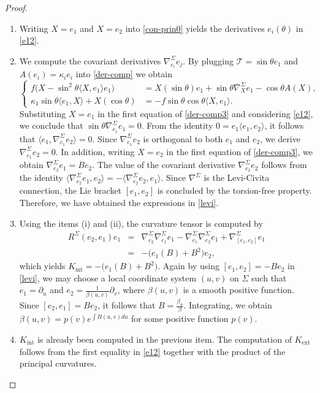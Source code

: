 \documentclass[12pt,reqno]{amsart}
\def\t{\mathcal T}
\theoremstyle{definition}
\begin{document}
\begin{proof}
\begin{enumerate}
\item[(i)] Writing $X=e_1$ and $X=e_2$ into \eqref{con-prin0} yields the derivatives $e_i(\theta)$ in \eqref{e12}.
\item[(ii)] We compute the covariant derivatives $\nabla^\Sigma_{e_i}e_j$. By plugging $\t=\sin\theta e_1$ and $A(e_i)=\kappa_ie_i$ into \eqref{der-comp} we obtain
\begin{equation}\label{der-comp3}
\left\{
\begin{aligned}
f\big(X-\sin^2 \theta\langle X,e_1\rangle e_1\big)
&=X(\sin \theta)e_1+\sin \theta\nabla^\Sigma_Xe_1-\cos \theta A(X),\\[4pt]
\kappa_1\sin \theta\langle e_1,X\rangle+ X(\cos \theta)
&=-f \sin \theta\cos \theta \langle X,e_1\rangle.
\end{aligned}
\right.
\end{equation}
Substituting $X=e_1$ in the first equation of \eqref{der-comp3} and considering \eqref{e12}, we conclude that $\sin \theta\nabla^\Sigma_{e_1}e_1=0$. From the identity $0=e_1\langle e_1,e_2\rangle$, it follows that $\langle e_1,\nabla^\Sigma_{e_1}e_2\rangle=0$. Since $\nabla^\Sigma_{e_1}e_2$ is orthogonal to both $e_1$ and $e_2$, we derive $\nabla^\Sigma_{e_1}e_2=0$. In addition, writing $X=e_2$ in the first equation of \eqref{der-comp3}, we obtain $ \nabla^\Sigma_{e_2}e_1=Be_2$. The value of the covariant derivative $\nabla^\Sigma_{e_2}e_2$  follows from the identity $\langle \nabla^\Sigma_{e_2}e_1,e_2\rangle=- \langle \nabla^\Sigma_{e_2}e_2,e_1\rangle.$ Since $\nabla^\Sigma$ is the Levi-Civita connection,  the Lie bracket $[e_1,e_2]$ is concluded by the torsion-free property. Therefore, we have obtained the expressions in \eqref{levi}.
\item[(iii)] Using the items (i) and (ii), the curvature tensor is computed by 
\begin{eqnarray*}
R^\Sigma(e_2,e_1)e_1&=&\nabla^\Sigma_{e_2}\nabla^\Sigma_{e_1}e_1-\nabla^\Sigma_{e_1}\nabla^\Sigma_{e_2}e_1+\nabla^\Sigma_{[e_1,e_2]}e_1 \\
&=& -\big(e_1(B)+B^2\big)e_2,
\end{eqnarray*}
which yields $K_{\mathrm{int}}=-\big(e_1(B)+B^2\big)$. Again by using $[e_1,e_2]=-Be_2$ in \eqref{levi}, we may choose a local coordinate system $(u,v)$ on $\Sigma$ such that $e_1=\partial_u$ and $e_2=\frac{1}{\beta(u,v)}\partial_v$, where $\beta(u,v)$ is a smooth positive function. Since $[e_2,e_1]=B e_2$, it follows that $B=\frac{\beta_u}{\beta}$. Integrating, we obtain $\beta(u,v)=p(v)e^{\int B(u,v)du}$ for some positive function $p(v)$. 
\item[(iv)] $K_{\mathrm{int}}$ is already been computed in the previous item. The computation of $K_{\mathrm{ext}}$ follows from the first equality in \eqref{e12} together with the product of the principal curvatures.
\end{enumerate}
\end{proof}
\end{document}

